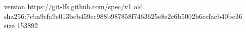 version https://git-lfs.github.com/spec/v1
oid sha256:7cba9cfa9e013bcb459cc988b987858f7463625e8e2c6b5002b6cefacb40bc36
size 153892
